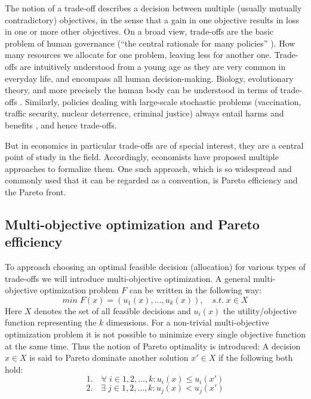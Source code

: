 

	The notion of a trade-off describes a decision between multiple (usually mutually contradictory) objectives, in the sense that a gain in one objective results in loss in one or more other objectives.
	On a broad view, trade-offs are the basic problem of human governance (``the central rationale for many policies'' \cite[p.~77]{Hardin1989}).
    How many resources we allocate for one problem, leaving less for another one.
	Trade-offs are intuitively understood from a young age as they are very common in everyday life, and encompass all human decision-making.
	Biology, evolutionary theory, and more precisely the human body can be understood in terms of trade-offs \cite{Launer2020}.
	Similarly, policies dealing with large-scale stochastic problems (vaccination, traffic security, nuclear deterrence, criminal justice) always entail harms and benefits \cite{Hardin1989}, and hence trade-offs.

	But in economics in particular trade-offs are of special interest, they are a central point of study in the field.
	Accordingly, economists have proposed multiple approaches to formalize them.
	One such approach, which is so widespread and commonly used that it can be regarded as a convention, is Pareto efficiency and the Pareto front.

	\subsection{Multi-objective optimization and Pareto efficiency}

	To approach choosing an optimal feasible decision (allocation) for various types of trade-offs we will introduce multi-objective optimization.
	A general multi-objective optimization problem $F$ can be written in the following way:
	$$min \; F(x)=(u_1(x),\dots,u_k(x)), \quad s.t.\; x\in X$$
	Here $X$ denotes the set of all feasible decisions and $u_i(x)$ the utility/objective function representing the $k$ dimensions.
	For a non-trivial multi-objective optimization problem it is not possible to minimize every single objective function at the same time.
	Thus the notion of Pareto optimality is introduced:
	A decision $x\in X$ is said to Pareto dominate another solution $x'\in X$ if the following both hold:
	$$1.\quad \forall\; i\in {1,2,\dots,k}: u_i(x)\le u_i(x')$$
	$$2.\quad \exists\; j\in {1,2,\dots,k}: u_j(x) < u_j(x')$$

